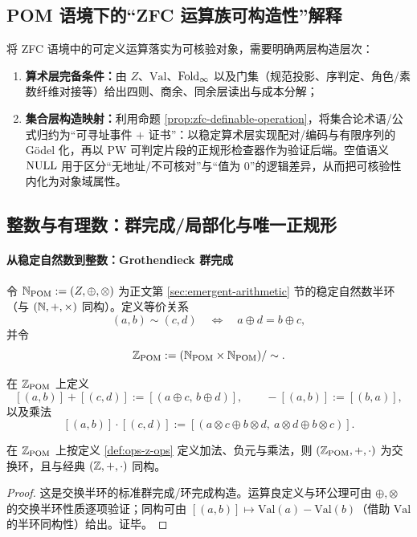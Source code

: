 \subsection{POM 语境下的“ZFC 运算族可构造性”解释}
将 ZFC 语境中的可定义运算落实为可核验对象，需要明确两层构造层次：
\begin{enumerate}
  \item \textbf{算术层完备条件：}由 $Z$、$\mathrm{Val}$、$\mathrm{Fold}_\infty$ 以及门集（规范投影、序判定、角色/素数纤维对接等）给出四则、商余、同余层读出与成本分解；
  \item \textbf{集合层构造映射：}利用命题 \ref{prop:zfc-definable-operation}，将集合论术语/公式归约为“可寻址事件 $+$ 证书”：以稳定算术层实现配对/编码与有限序列的 Gödel 化，再以 PW 可判定片段的正规形检查器作为验证后端。空值语义 $\mathrm{NULL}$ 用于区分“无地址/不可核对”与“值为 0”的逻辑差异，从而把可核验性内化为对象域属性。
\end{enumerate}

\subsection{整数与有理数：群完成/局部化与唯一正规形}\label{subsec:ops-zq}

\paragraph{从稳定自然数到整数：Grothendieck 群完成}
令 $\mathbb{N}_{\mathrm{POM}}:=(Z,\oplus,\otimes)$ 为正文第 \ref{sec:emergent-arithmetic} 节的稳定自然数半环（与 $(\mathbb{N},+,\times)$ 同构）。定义等价关系
$$
(a,b)\sim(c,d)\quad\Longleftrightarrow\quad a\oplus d=b\oplus c,
$$
并令
$$
\mathbb{Z}_{\mathrm{POM}}:=(\mathbb{N}_{\mathrm{POM}}\times\mathbb{N}_{\mathrm{POM}})/\sim .
$$

\begin{definition}[整数对象上的环运算]\label{def:ops-z-ops}
在 $\mathbb{Z}_{\mathrm{POM}}$ 上定义
$$
[(a,b)]+[(c,d)]:=[(a\oplus c,\,b\oplus d)],\qquad
-[(a,b)]:=[(b,a)],
$$
以及乘法
$$
[(a,b)]\cdot[(c,d)]
:=[(a\otimes c\oplus b\otimes d,\ a\otimes d\oplus b\otimes c)].
$$
\end{definition}

\begin{theorem}\label{thm:ops-z-ring}
在 $\mathbb{Z}_{\mathrm{POM}}$ 上按定义 \ref{def:ops-z-ops} 定义加法、负元与乘法，则 $(\mathbb{Z}_{\mathrm{POM}},+,\cdot)$ 为交换环，且与经典 $(\mathbb{Z},+,\cdot)$ 同构。
\end{theorem}

\begin{proof}
这是交换半环的标准群完成/环完成构造。运算良定义与环公理可由 $\oplus,\otimes$ 的交换半环性质逐项验证；同构可由 $[(a,b)]\mapsto \mathrm{Val}(a)-\mathrm{Val}(b)$（借助 $\mathrm{Val}$ 的半环同构性）给出。证毕。
\end{proof}

